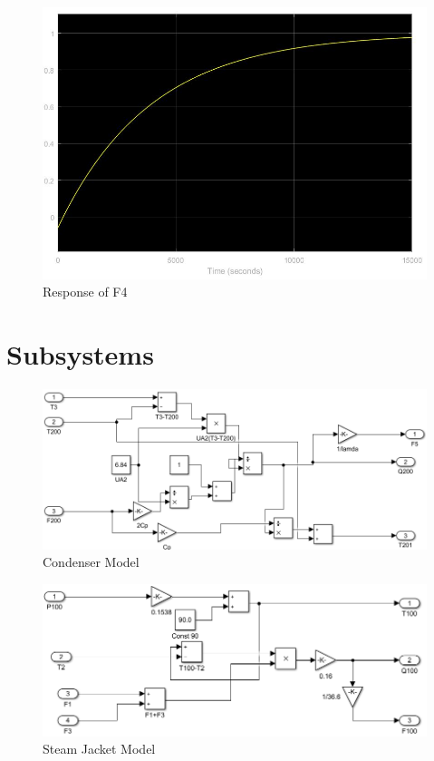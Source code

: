 \documentclass[11pt]{article}
\begin{document}
\begin{figure}[H]
\centering	\includegraphics[scale = 0.4]
{F4_15000}
\caption{Response of F4}
\label{F4}
\end{figure}

\section{Subsystems}

\begin{figure}[H]
\centering	\includegraphics[scale = 0.8]
{condenser}
\caption{Condenser Model}
\label{condenser}
\end{figure}

\begin{figure}[H]
\centering	\includegraphics[scale = 0.8]
{steamjacket}
\caption{Steam Jacket Model}
\label{steamjacket}
\end{figure}
\end{document}
